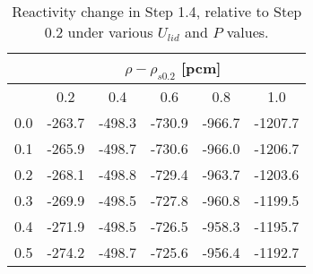 \begin{table}[htbp!]
	\caption{Reactivity change in Step 1.4, relative to Step 0.2 under various
	$U_{lid}$ and $P$ values.}
	\centering
	\small
	\setlength\tabcolsep{1.5pt}
	\begin{tabular}{c c c c c c}
		\toprule
		& \multicolumn{5}{c}{$\rho - \rho_{s0.2}$ [pcm]} \\
		\midrule
		{\backslashbox{$U_{lid}$ [m$\cdot$s$^{-1}$]}{$P$ [GW]}} & 0.2 & 0.4 & 0.6 & 0.8 & 1.0 \\
		\midrule
		0.0 & -263.7 & -498.3 & -730.9 & -966.7 & -1207.7 \\
		0.1 & -265.9 & -498.7 & -730.6 & -966.0 & -1206.7 \\
		0.2 & -268.1 & -498.8 & -729.4 & -963.7 & -1203.6 \\
		0.3 & -269.9 & -498.5 & -727.8 & -960.8 & -1199.5 \\
		0.4 & -271.9 & -498.5 & -726.5 & -958.3 & -1195.7 \\
		0.5 & -274.2 & -498.7 & -725.6 & -956.4 & -1192.7 \\
		\bottomrule
	\end{tabular}
	\label{table:full}
\end{table}
